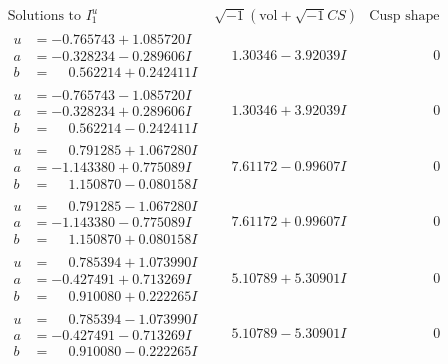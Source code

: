 \documentclass[1p]{elsarticle_modified}
\theoremstyle{definition}
\newcommand{\I}{\sqrt{-1}}
\begin{document}
$$\begin{array}{c|c|c}
\text{Solutions to }I^u_{1}& \I (\text{vol} + \sqrt{-1}CS) & \text{Cusp shape}\\
 \hline 
\begin{aligned}
u &= -0.765743 + 1.085720 I \\
a &= -0.328234 - 0.289606 I \\
b &= \phantom{-}0.562214 + 0.242411 I\end{aligned}
 & \phantom{-}1.30346 - 3.92039 I & \phantom{-0.000000 } 0 \\ \hline\begin{aligned}
u &= -0.765743 - 1.085720 I \\
a &= -0.328234 + 0.289606 I \\
b &= \phantom{-}0.562214 - 0.242411 I\end{aligned}
 & \phantom{-}1.30346 + 3.92039 I & \phantom{-0.000000 } 0 \\ \hline\begin{aligned}
u &= \phantom{-}0.791285 + 1.067280 I \\
a &= -1.143380 + 0.775089 I \\
b &= \phantom{-}1.150870 - 0.080158 I\end{aligned}
 & \phantom{-}7.61172 - 0.99607 I & \phantom{-0.000000 } 0 \\ \hline\begin{aligned}
u &= \phantom{-}0.791285 - 1.067280 I \\
a &= -1.143380 - 0.775089 I \\
b &= \phantom{-}1.150870 + 0.080158 I\end{aligned}
 & \phantom{-}7.61172 + 0.99607 I & \phantom{-0.000000 } 0 \\ \hline\begin{aligned}
u &= \phantom{-}0.785394 + 1.073990 I \\
a &= -0.427491 + 0.713269 I \\
b &= \phantom{-}0.910080 + 0.222265 I\end{aligned}
 & \phantom{-}5.10789 + 5.30901 I & \phantom{-0.000000 } 0 \\ \hline\begin{aligned}
u &= \phantom{-}0.785394 - 1.073990 I \\
a &= -0.427491 - 0.713269 I \\
b &= \phantom{-}0.910080 - 0.222265 I\end{aligned}
 & \phantom{-}5.10789 - 5.30901 I & \phantom{-0.000000 } 0 \\ \hline\begin{aligned}

\end{aligned}
\end{array}$$
\end{document}
